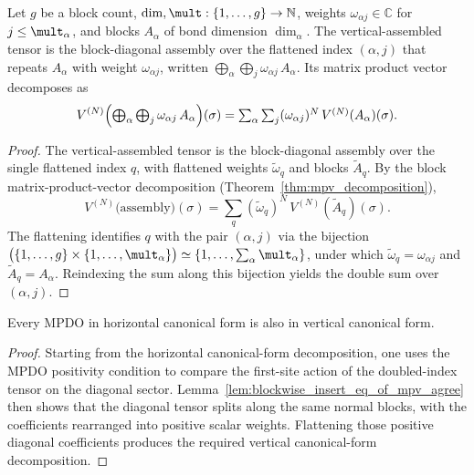 \begin{lemma}
    \label{lem:mpv_vertical_assembled}
    \leanok
    Let $g$ be a block count, $\dim,\mult:\{1,\dots,g\}\to\mathbb N$, weights
    $\omega_{\alpha j}\in\mathbb C$ for $j\le\mult_\alpha$, and blocks $A_\alpha$ of
    bond dimension $\dim_\alpha$. The vertical-assembled tensor is the
    block-diagonal assembly over the flattened index $(\alpha, j)$ that repeats
    $A_\alpha$ with weight $\omega_{\alpha j}$, written
    $\bigoplus_\alpha\bigoplus_j \omega_{\alpha j}\, A_\alpha$. Its matrix product
    vector decomposes as
    \[
        V^{(N)}\Bigl(\textstyle\bigoplus_\alpha\bigoplus_j
        \omega_{\alpha j}\, A_\alpha\Bigr)(\sigma)
        = \sum_{\alpha}\sum_{j} (\omega_{\alpha j})^N\, V^{(N)}(A_\alpha)(\sigma).
    \]
\end{lemma}
\begin{proof}\leanok
    The vertical-assembled tensor is the block-diagonal assembly over the single
    flattened index $q$, with flattened weights $\widetilde\omega_q$ and blocks
    $\widetilde A_q$. By the block matrix-product-vector decomposition
    (Theorem~\ref{thm:mpv_decomposition}),
    \[
        V^{(N)}\bigl(\text{assembly}\bigr)(\sigma)
        = \sum_{q} (\widetilde\omega_q)^N\, V^{(N)}(\widetilde A_q)(\sigma).
    \]
    The flattening identifies $q$ with the pair $(\alpha, j)$ via the bijection
    $\bigl(\{1,\dots,g\}\times\{1,\dots,\mult_\alpha\}\bigr)\simeq
        \{1,\dots,\sum_\alpha\mult_\alpha\}$, under which $\widetilde\omega_q=
        \omega_{\alpha j}$ and $\widetilde A_q = A_\alpha$. Reindexing the sum along
    this bijection yields the double sum over $(\alpha, j)$.
\end{proof}

\begin{theorem}
    \label{thm:vertical_cf_of_horizontal_cf}
    \notready
    Every MPDO in horizontal canonical form is also in vertical canonical form.
\end{theorem}

\begin{proof}
    Starting from the horizontal canonical-form decomposition, one uses the MPDO
    positivity condition to compare the first-site action of the doubled-index
    tensor on the diagonal sector. Lemma~\ref{lem:blockwise_insert_eq_of_mpv_agree}
    then shows that the diagonal tensor splits
    along the same normal blocks, with the coefficients rearranged into
    positive scalar weights.
    Flattening those positive diagonal coefficients produces the required
    vertical canonical-form decomposition.
\end{proof}

